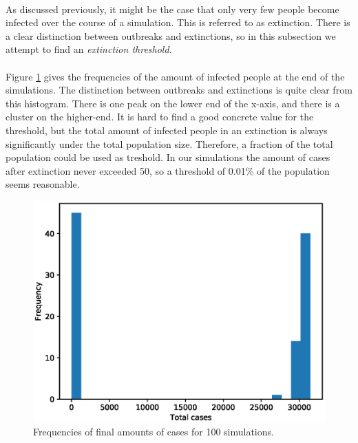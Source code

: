 \documentclass[runningheads]{llncs}
\begin{document}
\paragraph{} As discussed previously, it might be the case that only very few people become infected over the course of a simulation. This is referred to as extinction. There is a clear distinction between outbreaks and extinctions, so in this subsection we attempt to find an \emph{extinction threshold}.

\paragraph{} Figure \ref{ETHist} gives the frequencies of the amount of infected people at the end of the simulations. The distinction between outbreaks and extinctions is quite clear from this histogram. There is one peak on the lower end of the x-axis, and there is a cluster on the higher-end. It is hard to find a good concrete value for the threshold, but the total amount of infected people in an extinction is always significantly under the total population size. Therefore, a fraction of the total population could be used as treshold. In our simulations the amount of cases after extinction never exceeded 50, so a threshold of 0.01\% of the population seems reasonable.

\begin{figure}[!h]
	\includegraphics[width=\textwidth]{Hist.eps}
	\caption{Frequencies of final amounts of cases for 100 simulations.} 
	\label{ETHist}
\end{figure}
\end{document}
